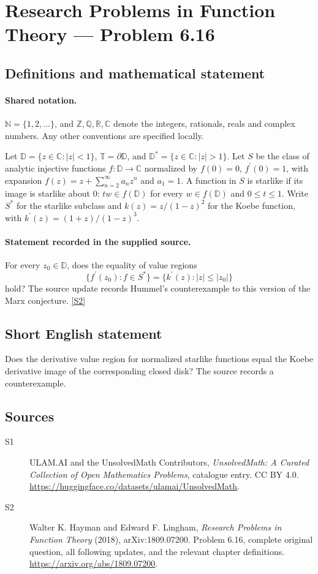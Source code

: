 \documentclass[11pt]{book}
\newcommand{\sref}[2]{\hyperlink{source:#1:#2}{[S#2]}}
\begin{document}
\section{Research Problems in Function Theory — Problem 6.16}\label{statement}

\subsection{Definitions and mathematical statement}

\paragraph{Shared notation.}$\mathbb N=\{1,2,\ldots\}$, and $\mathbb Z,\mathbb Q,\mathbb R,\mathbb C$ denote the integers, rationals, reals and complex numbers. Any other conventions are specified locally.


Let $\mathbb D=\{z\in\mathbb C:|z|<1\}$, $\mathbb T=\partial\mathbb D$, and $\mathbb D^*=\{z\in\mathbb C:|z|>1\}$. Let $S$ be the class of analytic injective functions $f:\mathbb D\to\mathbb C$ normalized by $f(0)=0$, $f^{\prime}(0)=1$, with expansion $f(z)=z+\sum_{n=2}^{\infty}a_nz^n$ and $a_1=1$. A function in $S$ is starlike if its image is starlike about $0$: $tw\in f(\mathbb D)$ for every $w\in f(\mathbb D)$ and $0\le t\le1$. Write $S^*$ for the starlike subclass and $k(z)=z/(1-z)^2$ for the Koebe function, with $k^{\prime}(z)=(1+z)/(1-z)^3$.
\paragraph{Statement recorded in the supplied source.}
For every $z_0\in\mathbb D$, does the equality of value regions \[\{f^{\prime}(z_0):f\in S^*\}=\{k^{\prime}(z):|z|\le|z_0|\}\] hold? The source update records Hummel’s counterexample to this version of the Marx conjecture. \sref{statement}{2}
\subsection{Short English statement}
Does the derivative value region for normalized starlike functions equal the Koebe derivative image of the corresponding closed disk? The source records a counterexample.
\subsection{Sources}
\begin{description}
\item[\hypertarget{source:statement:1}{S1}] ULAM.AI and the UnsolvedMath Contributors, \emph{UnsolvedMath: A Curated Collection of Open Mathematics Problems}, catalogue entry. CC BY 4.0. \url{https://huggingface.co/datasets/ulamai/UnsolvedMath}.
\item[\hypertarget{source:statement:2}{S2}] Walter K. Hayman and Edward F. Lingham, \emph{Research Problems in Function Theory} (2018), arXiv:1809.07200. Problem 6.16, complete original question, all following updates, and the relevant chapter definitions. \url{https://arxiv.org/abs/1809.07200}.
\end{description}
\label{end:statement}
\end{document}

